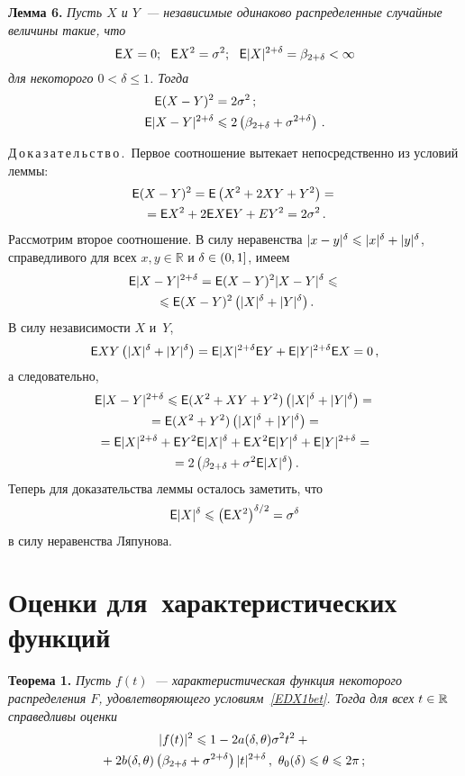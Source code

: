 \begin{multicols}{2}
\noindent
\textbf{Лемма 6.}
\textit{Пусть $X$ и $Y$~--- независимые одинаково распределенные случайные
величины такие, что}
$$
{\sf E} X=0;\ \ {\sf E} X^2=\sigma^2;\ \ {\sf E} |X|^{2+\delta}=\beta_{2+\delta}<\infty
$$
\textit{для некоторого $0<\delta\le1$. Тогда}
\begin{align*}
{\sf E} (X-Y)^2&=2\sigma^2\,;\\
{\sf E} |X-Y|^{2+\delta}&\leqslant2\left(\beta_{2+\delta}+\sigma^{2+\delta}\right)\,.
\end{align*}

\medskip

Д\,о\,к\,а\,з\,а\,т\,е\,л\,ь\,с\,т\,в\,о\,.\ Первое соотношение вытекает непосредственно из условий
леммы:
\begin{multline*}
{\sf E} (X-Y)^2={\sf E} \left(X^2+2XY+Y^2\right)={}\\
{}= {\sf E} X^2+2{\sf E} X{\sf E} Y+E Y^2=2\sigma^2\,.
\end{multline*}
Рассмотрим второе соотношение. В силу неравенства
$|x-y|^{\delta}\leqslant|x|^{\delta}+|y|^{\delta}$, справедливого для всех
$x,y\in\mathbb R$ и $\delta\in(0,1]$, имеем
\begin{multline*}
{\sf E} |X-Y|^{2+\delta}= {\sf E} (X-Y)^2|X-Y|^{\delta}\leqslant{}\\
{}\leqslant {\sf E} (X-Y)^2\left(|X|^{\delta}+|Y|^{\delta}\right).
\end{multline*}
В силу независимости $X$ и~$Y$,
$$
{\sf E} XY\left(|X|^{\delta}+|Y|^{\delta}\right)= {\sf E} |X|^{2+\delta}{\sf E} Y+{\sf E}
|Y|^{2+\delta}{\sf E} X=0\,,
$$
а следовательно,
\begin{multline*}
{\sf E} |X-Y|^{2+\delta}\leqslant {\sf E} (X^2+XY+Y^2)\left(|X|^{\delta}+|Y|^{\delta}\right)={}\\
{}= {\sf E}
(X^2+Y^2)\left(|X|^{\delta}+|Y|^{\delta}\right)={}\\
{}=
{\sf E} |X|^{2+\delta}+{\sf E} Y^2{\sf E} |X|^{\delta}+{\sf E} X^2{\sf E} |Y|^{\delta}+{\sf E} |Y|^{2+\delta}={}\\
{}=
2\left(\beta_{2+\delta}+\sigma^2{\sf E} |X|^{\delta}\right).
\end{multline*}
Теперь для доказательства леммы осталось заметить, что
$$
{\sf E} |X|^{\delta}\leqslant\left({\sf E} X^2\right)^{\delta/2}=\sigma^{\delta}
$$
в силу неравенства Ляпунова.

\smallskip

\section{Оценки для~характеристических функций}

\noindent
\textbf{Теорема 1.}
\label{Ocenkaf(t)Obw}
\textit{Пусть $f(t)$~--- характеристическая функция некоторого распределения
$F$, удовлетворяющего условиям~\eqref{EDX1bet}. Тогда для всех
$t\in\mathbb R$ справедливы оценки}
\begin{multline}
\label{Ocenka|f(t)|^2obwaja}
|f(t)|^2\leqslant 1-2a(\delta,\theta)\sigma^2t^2+{}\\
\!\!\!\!{}+ 2b(\delta,\theta)\left(\beta_{2+\delta}+
\sigma^{2+\delta}\right)|t|^{2+\delta}\,,\ \theta_0(\delta)\leqslant\theta\leqslant2\pi\,;\!\!
\end{multline}


\end{multicols}
